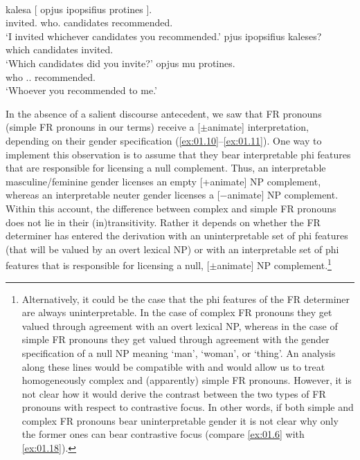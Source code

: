 \documentclass[output=paper]{langsci/langscibook}
\begin{document}
\ea {}\label{ex:01.23}\\
	\gll kalesa [ opjus ipopsifius protines ].\\
    invited.\Fsg{} {} who.\Acc{} candidates recommended.\Ssg{} {}\\
	\glt \enquote*{I invited whichever candidates you recommended.}
\ex {}\label{ex:01.24}
	\ea
		\gll pjus ipopsifius kaleses?\\
			which candidates invited.\Ssg{}\\
		\glt \enquote*{Which candidates did you invite?}
	\ex
		\gll opjus mu protines.\\
			who \Cl.\Fsg.\Gen{} recommended.\Ssg{}\\
		\glt \enquote*{Whoever you recommended to me.}
	\z
\z

In the absence of a salient discourse antecedent, we saw that \gls{FR} pronouns
(simple \gls{FR} pronouns in our
terms) receive a [$\pm$animate] interpretation, depending on their gender
specification (\ref{ex:01.10}--\ref{ex:01.11}). One way to implement
this observation is to assume that they bear interpretable phi features that
are responsible for licensing a null complement. Thus, an interpretable
masculine/feminine gender licenses an empty [+animate] NP complement, whereas
an interpretable neuter gender licenses a [−animate] NP complement. Within this
account, the difference between complex and simple \gls{FR}
pronouns does not lie in their
(in)transitivity. Rather it depends on whether the \gls{FR} determiner has
entered the derivation with an uninterpretable set of phi features (that will
be valued by an overt lexical NP) or with an interpretable set of phi features
that is responsible for licensing a null, [$\pm$animate] NP
complement.\footnote{Alternatively, it could be the case that the phi features
    of the \gls{FR} determiner are always uninterpretable. In the case of
    complex \gls{FR} pronouns they
    get valued through agreement with an overt lexical NP, whereas in the case
    of simple \gls{FR} pronouns
    they get valued through agreement with the gender specification of a null
    NP meaning ‘man’, ‘woman’, or ‘thing’. An analysis along these lines would
    be compatible with \textcite{Panagiotidis2003} and would allow us to treat
    homogeneously complex and (apparently) simple \gls{FR} pronouns. However,
    it is not clear how it would derive the contrast between the two types of
    \gls{FR} pronouns with respect
    to contrastive focus. In other words, if both
    simple and complex \gls{FR} pronouns bear uninterpretable gender it is not
    clear why only the former ones can bear contrastive
    focus (compare \eqref{ex:01.6} with
\eqref{ex:01.18}).}
\end{document}

